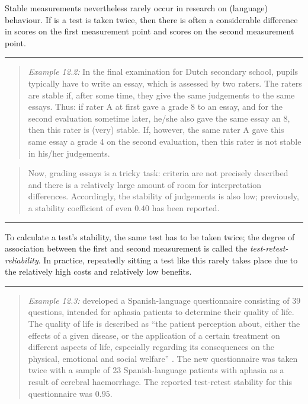 \documentclass[
]{book}
\begin{document}
Stable measurements nevertheless rarely occur in research on
(language) behaviour. If is a test is taken twice, then there is often
a considerable difference in scores on the first measurement point
and scores on the second measurement point.

\begin{center}\rule{0.5\linewidth}{0.5pt}\end{center}

\begin{quote}
\emph{Example 12.2:}
In the final examination for Dutch secondary school, pupils typically have to write an essay, which is
assessed by two raters. The raters are stable if, after some time, they
give the same judgements to the same essays. Thus: if rater A at first gave a grade
8 to an essay, and for the second evaluation sometime later, he/she also gave the same
essay an 8, then this rater is (very) stable. If, however, the same
rater A gave this same essay a grade 4 on the second evaluation, then this
rater is not stable in his/her judgements.
\end{quote}

\begin{quote}
Now, grading essays is a tricky task: criteria are not precisely described
and there is a relatively large amount of room for
interpretation differences. Accordingly, the stability of judgements is also
low; previously, a stability coefficient of even \(0.40\) has
been reported.
\end{quote}

\begin{center}\rule{0.5\linewidth}{0.5pt}\end{center}

To calculate a test's stability, the same test has to be
taken twice; the degree of association between the first and
second measurement is called the \emph{test-retest-reliability}.
In practice, repeatedly sitting a test like this rarely takes place due to
the relatively high costs and relatively low benefits.

\begin{center}\rule{0.5\linewidth}{0.5pt}\end{center}

\begin{quote}
\emph{Example 12.3:}
\citet{Lata09} developed
a Spanish-language questionnaire consisting of 39 questions, intended
for aphasia patients to determine their quality of life. The quality of life
is described as ``the patient perception about, either the
effects of a given disease, or the application of a certain treatment on
different aspects of life, especially regarding its consequences on the
physical, emotional and social welfare'' \citep[p.379]{Lata09}. The new questionnaire
was taken twice with a sample of 23
Spanish-language patients with aphasia as a result of cerebral haemorrhage.
The reported test-retest stability for this questionnaire was
\(0.95\).
\end{quote}
\end{document}

